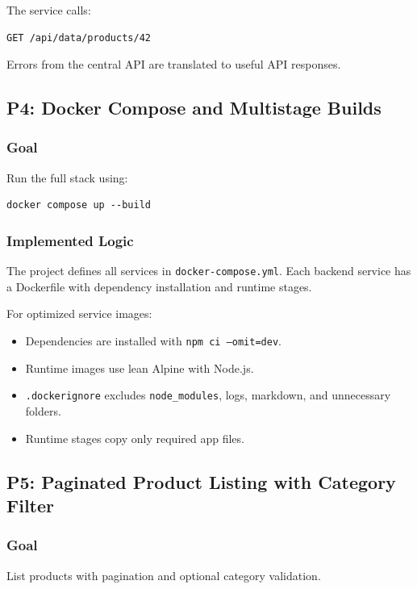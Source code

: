 \documentclass[11pt,a4paper]{article}
\begin{document}
The service calls:

\begin{lstlisting}
GET /api/data/products/42
\end{lstlisting}

Errors from the central API are translated to useful API responses.

\subsection{P4: Docker Compose and Multistage Builds}

\subsubsection*{Goal}
Run the full stack using:

\begin{lstlisting}
docker compose up --build
\end{lstlisting}

\subsubsection*{Implemented Logic}

The project defines all services in \texttt{docker-compose.yml}. Each backend service has a Dockerfile with dependency installation and runtime stages.

For optimized service images:

\begin{itemize}
  \item Dependencies are installed with \texttt{npm ci --omit=dev}.
  \item Runtime images use lean Alpine with Node.js.
  \item \texttt{.dockerignore} excludes \texttt{node\_modules}, logs, markdown, and unnecessary folders.
  \item Runtime stages copy only required app files.
\end{itemize}

\subsection{P5: Paginated Product Listing with Category Filter}

\subsubsection*{Goal}
List products with pagination and optional category validation.
\end{document}

